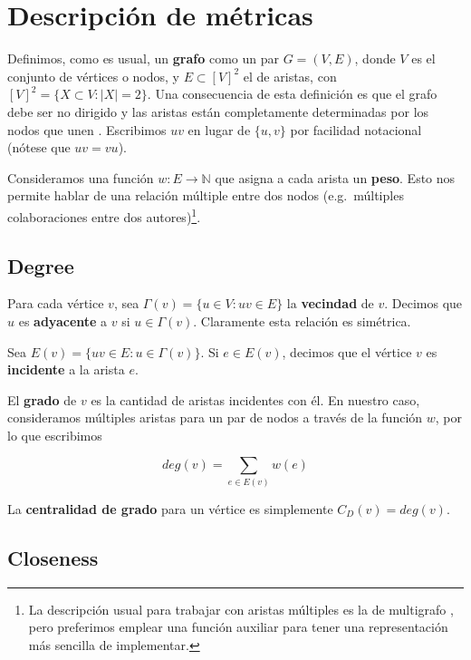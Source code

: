 \documentclass[journal]{IEEEtran}
\begin{document}
\section{Descripción de métricas} \label{sec:metricas}

Definimos, como es usual, un \textbf{grafo} como un par \(G = (V, E)\), donde \(V\) es el conjunto de vértices o nodos, y \(E \subset [V]^2 \) el de aristas, con \([V]^2 = \{ X \subset V : |X| = 2 \}\). Una consecuencia de esta definición es que el grafo debe ser no dirigido y las aristas están completamente determinadas por los nodos que unen \cite{diestel}. Escribimos \(uv\) en lugar de \(\{u, v\}\) por facilidad notacional (nótese que \(uv = vu\)).

Consideramos una función \(w: E \rightarrow \mathbb{N} \) que asigna a cada arista un \textbf{peso}. Esto nos permite hablar de una relación múltiple entre dos nodos (e.g.\ múltiples colaboraciones entre dos autores)\footnote{La descripción usual para trabajar con aristas múltiples es la de multigrafo \cite{diestel}, pero preferimos emplear una función auxiliar para tener una representación más sencilla de implementar. }.

\subsection{Degree}

Para cada vértice \(v\), sea \(\Gamma(v) = \{u \in V : uv \in E \}\) la \textbf{vecindad} de \(v\). Decimos que \(u\) es \textbf{adyacente} a \(v\) si \(u \in \Gamma(v)\). Claramente esta relación es simétrica.

Sea \(E(v) = \{uv \in E : u \in \Gamma(v) \}\). Si \(e \in E(v)\), decimos que el vértice \(v\) es \textbf{incidente} a la arista \(e\).

El \textbf{grado} de \(v\) es la cantidad de aristas incidentes con él. En nuestro caso, consideramos múltiples aristas para un par de nodos a través de la función \(w\), por lo que escribimos \cite{bollobas}

\begin{equation}
	deg(v) = \sum_{e \in E(v)} w(e)
\end{equation}

La \textbf{centralidad de grado} para un vértice es simplemente \(C_D (v) = deg(v)\).

\subsection{Closeness}
\end{document}
